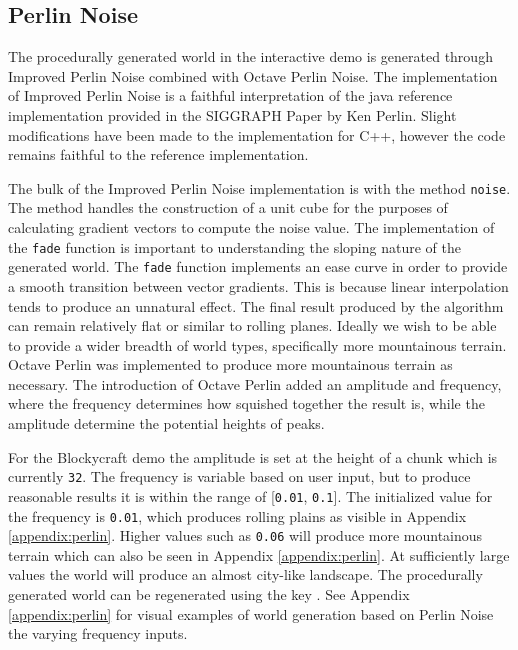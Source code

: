 \documentclass[a4paper,11pt,titlepage]{scrartcl}
\newcommand{\Blockycraft}{Blockycraft}
\begin{document}
\subsection{Perlin Noise}
\label{section:perlin}
The procedurally generated world in the interactive demo is generated through Improved Perlin Noise combined with Octave Perlin Noise.  The implementation of Improved Perlin Noise is a faithful interpretation of the java reference implementation provided in the SIGGRAPH Paper by Ken Perlin.  Slight modifications have been made to the implementation for C++, however the code remains faithful to the reference implementation.

The bulk of the Improved Perlin Noise implementation is with the method \texttt{noise}.  The method handles the construction of a unit cube for the purposes of calculating gradient vectors to compute the noise value.  The implementation of the \texttt{fade} function is important to understanding the sloping nature of the generated world.  The \texttt{fade} function implements an ease curve in order to provide a smooth transition between vector gradients.  This is because linear interpolation tends to produce an unnatural effect. The final result produced by the algorithm can remain relatively flat or similar to rolling planes.  Ideally we wish to be able to provide a wider breadth of world types, specifically more mountainous terrain.  Octave Perlin was implemented to produce more mountainous terrain as necessary.  The introduction of Octave Perlin added an amplitude and frequency, where the frequency determines how squished together the result is, while the amplitude determine the potential heights of peaks.
    
For the \Blockycraft{} demo the amplitude is set at the height of a chunk which is currently \texttt{32}.  The frequency is variable based on user input, but to produce reasonable results it is within the range of [\texttt{0.01}, \texttt{0.1}].  The initialized value for the frequency is \texttt{0.01}, which produces rolling plains as visible in Appendix \ref{appendix:perlin}.  Higher values such as \texttt{0.06} will produce more mountainous terrain which can also be seen in Appendix \ref{appendix:perlin}.  At sufficiently large values the world will produce an almost city-like landscape.
\vskip 2.5mm\noindent
The procedurally generated world can be regenerated using the key .  See Appendix \ref{appendix:perlin} for visual examples of world generation based on Perlin Noise the varying frequency inputs.
    
\end{document}
